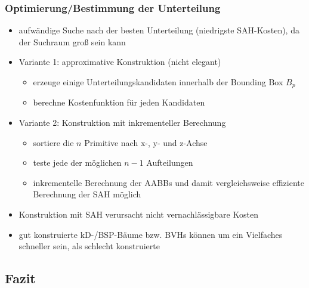 \documentclass[paper=a4, fontsize=11pt]{scrartcl} %
\numberwithin{equation}{section} %
\numberwithin{figure}{section} %
\numberwithin{table}{section} %
\begin{document}
\subsubsection{Optimierung/Bestimmung der Unterteilung}
\begin{itemize}
\item aufwändige Suche nach der besten Unterteilung (niedrigste SAH-Kosten), da der Suchraum groß sein kann
\item Variante 1: approximative Konstruktion (nicht elegant)
\begin{itemize}
\item erzeuge einige Unterteilungskandidaten innerhalb der Bounding Box $B_p$
\item berechne Kostenfunktion für jeden Kandidaten
\end{itemize}
\item Variante 2: Konstruktion mit inkrementeller Berechnung
\begin{itemize}
\item sortiere die $n$ Primitive nach x-, y- und z-Achse
\item teste jede der möglichen $n-1$ Aufteilungen
\item inkrementelle Berechnung der AABBs und damit vergleichsweise effiziente Berechnung der SAH möglich
\end{itemize}
\item Konstruktion mit SAH verursacht nicht vernachlässigbare Kosten
\item gut konstruierte kD-/BSP-Bäume bzw. BVHs können um ein Vielfaches schneller sein, als schlecht konstruierte
\end{itemize}

\subsection{Fazit}
\end{document}
